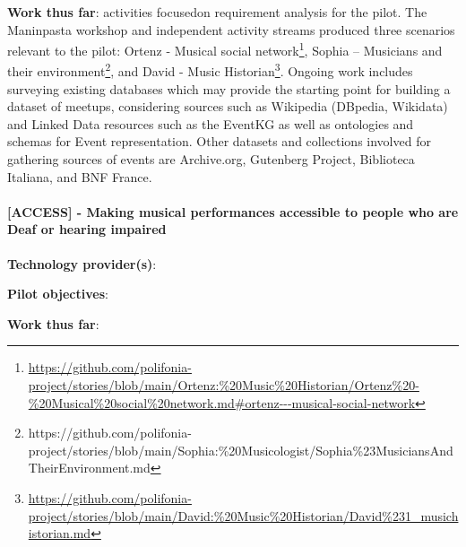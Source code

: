 \textbf{Work thus far}: activities focusedon requirement analysis for the pilot. The Maninpasta workshop and independent activity streams produced three scenarios relevant to the pilot: Ortenz - Musical social network\footnote{\url{https://github.com/polifonia-project/stories/blob/main/Ortenz:\%20Music\%20Historian/Ortenz\%20-\%20Musical\%20social\%20network.md\#ortenz---musical-social-network}}, Sophia -- Musicians and their environment\footnote{https://github.com/polifonia-project/stories/blob/main/Sophia:\%20Musicologist/Sophia\%23MusiciansAndTheirEnvironment.md}, and David - Music Historian\footnote{\url{https://github.com/polifonia-project/stories/blob/main/David:\%20Music\%20Historian/David\%231_musichistorian.md}}.
Ongoing work includes surveying existing databases which may provide the starting point for building a dataset of meetups, considering sources such as Wikipedia (DBpedia, Wikidata) and Linked Data resources such as the EventKG as well as ontologies and schemas for Event representation.
Other datasets and collections involved for gathering sources of events are Archive.org, Gutenberg Project, Biblioteca Italiana, and BNF France. 

\paragraph*{[ACCESS] - Making musical performances accessible to people who are Deaf or hearing impaired}\label{sec:pilot:access}

\textbf{Technology provider(s)}: 

\textbf{Pilot objectives}:

\textbf{Work thus far}: